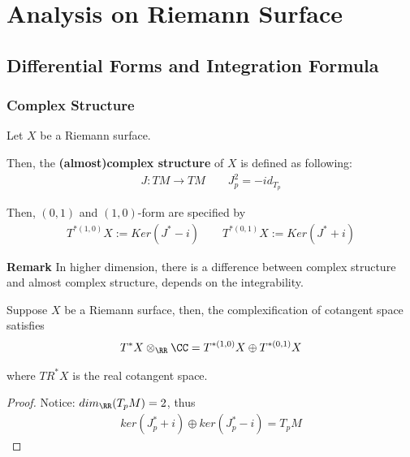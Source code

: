 \documentclass[Total.tex]{subfiles}
\begin{document}
	\chapter{Analysis on Riemann Surface}
	\section{Differential Forms and Integration Formula}
	\subsection{Complex Structure}
	\begin{Def}
		Let $X$ be a Riemann surface.
		
		Then, the \textbf{(almost)complex structure} of $X$ is defined as following: 
		\begin{gather*}
			J:TM\rightarrow TM\qquad J_p^2=-id_{T_p }
		\end{gather*}
	\end{Def}
	
	Then, $(0,1)$ and $(1,0)$-form are specified by
	\begin{gather*}
		T^{*(1,0)}X:=Ker(J^*-i)\qquad T^{*(0,1)}X:=Ker(J^*+i)
	\end{gather*}
	
	\textbf{Remark} In higher dimension, there is a difference between complex structure and almost complex structure, depends on the integrability. 
	
	\begin{proposition}
		Suppose $X$ be a Riemann surface, then, the complexification of cotangent space satisfies
		\begin{gather*}
			T^*X\otimes_\RR \CC=T^{*(1,0)}X\oplus T^{*(0,1)}X
		\end{gather*}
		
		where $TR^*X$ is the real cotangent space. 
	\end{proposition}
	\begin{proof}
		Notice: $dim_\RR(T_p M)=2$, thus
		\begin{gather*}
			ker(J^*_p+i)\oplus ker(J^*_p-i)=T_p M
		\end{gather*}
	\end{proof}
	
\end{document}

